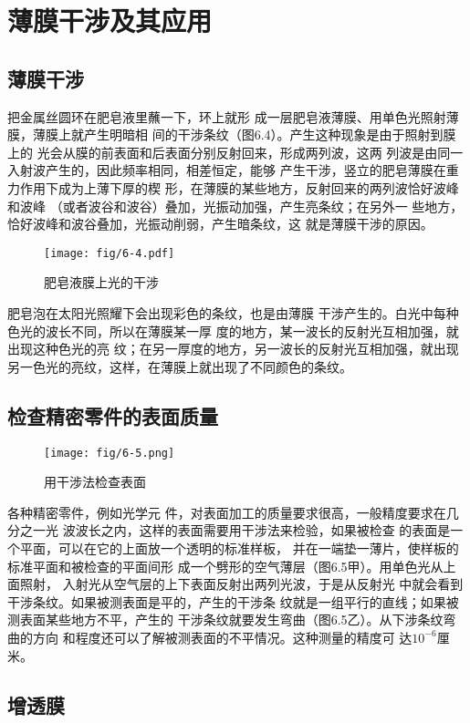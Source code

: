 \section{薄膜干涉及其应用}
\subsection{薄膜干涉}
把金属丝圆环在肥皂液里蘸一下，环上就形
成一层肥皂液薄膜、用单色光照射薄膜，薄膜上就产生明暗相
间的干涉条纹（图6.4）。产生这种现象是由于照射到膜上的
光会从膜的前表面和后表面分别反射回来，形成两列波，这两
列波是由同一入射波产生的，因此频率相同，相差恒定，能够
产生干涉，竖立的肥皂薄膜在重力作用下成为上薄下厚的楔
形，在薄膜的某些地方，反射回来的两列波恰好波峰和波峰
（或者波谷和波谷）叠加，光振动加强，产生亮条纹；在另外一
些地方，恰好波峰和波谷叠加，光振动削弱，产生暗条纹，这
就是薄膜干涉的原因。
\begin{figure}[htp]\centering
    \texttt{[image: fig/6-4.pdf]}
    \caption{肥皂液膜上光的干涉}
    \end{figure}


肥皂泡在太阳光照耀下会出现彩色的条纹，也是由薄膜
干涉产生的。白光中每种色光的波长不同，所以在薄膜某一厚
度的地方，某一波长的反射光互相加强，就出现这种色光的亮
纹；在另一厚度的地方，另一波长的反射光互相加强，就出现
另一色光的亮纹，这样，在薄膜上就出现了不同颜色的条纹。

\subsection{检查精密零件的表面质量}
\begin{figure}[htp]\centering
    \texttt{[image: fig/6-5.png]}
    \caption{用干涉法检查表面}
    \end{figure}

各种精密零件，例如光学元
件，对表面加工的质量要求很高，一般精度要求在几分之一光
波波长之内，这样的表面需要用干涉法来检验，如果被检查
的表面是一个平面，可以在它的上面放一个透明的标准样板，
并在一端垫一薄片，使样板的标准平面和被检查的平面间形
成一个劈形的空气薄层（图6.5甲）。用单色光从上面照射，
入射光从空气层的上下表面反射出两列光波，于是从反射光
中就会看到干涉条纹。如果被测表面是平的，产生的干涉条
纹就是一组平行的直线；如果被测表面某些地方不平，产生的
干涉条纹就要发生弯曲（图6.5乙）。从下涉条纹弯曲的方向
和程度还可以了解被测表面的不平情况。这种测量的精度可
达$10^{-6}$厘米。

\subsection{增透膜}

